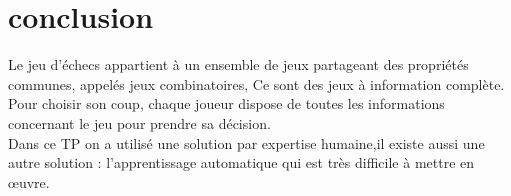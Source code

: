 \documentclass[12pt]{report}
\begin{document}
\chapter{conclusion}
Le jeu d’échecs appartient à un ensemble de jeux partageant des propriétés communes,
appelés jeux combinatoires, Ce sont des jeux à information complète. \\

Pour choisir son coup, chaque joueur dispose de toutes les informations concernant le jeu pour prendre sa décision.
\\

Dans ce TP on a utilisé une solution par expertise humaine,il existe aussi une autre solution : l'apprentissage automatique qui est très difficile à mettre en œuvre.
\\
\end{document}
